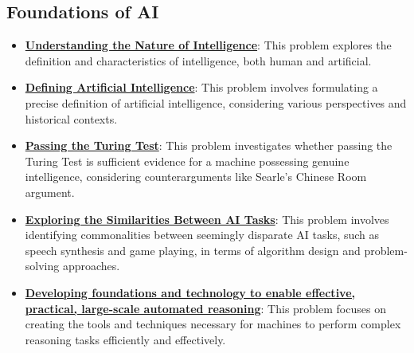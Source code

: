\documentclass{article}%
\begin{document}
\subsection{Foundations of AI}%
\label{subsec:FoundationsofAI}%
\begin{itemize}[leftmargin=*]%
\item \href{https://purdue.brightspace.com/d2l/common/assets/pdfjs-d2l-dist/1.0.14-legacy/web/viewer.html?file=\%2Fcontent\%2Fenforced\%2F1095467-wl.202510.CS.24300.001\%2F02L2-Intro.pdf\%3Fou\%3D1095467\&lang=en-us\&container=d2l-fileviewer-rendered-pdf\&fullscreen=d2l-fileviewer-rendered-pdf-dialog\&height=667#page=3}{\textbf{Understanding the Nature of Intelligence}}: This problem explores the definition and characteristics of intelligence, both human and artificial.%
\item \href{https://purdue.brightspace.com/d2l/common/assets/pdfjs-d2l-dist/1.0.14-legacy/web/viewer.html?file=\%2Fcontent\%2Fenforced\%2F1095467-wl.202510.CS.24300.001\%2F02L2-Intro.pdf\%3Fou\%3D1095467\&lang=en-us\&container=d2l-fileviewer-rendered-pdf\&fullscreen=d2l-fileviewer-rendered-pdf-dialog\&height=667#page=5}{\textbf{Defining Artificial Intelligence}}: This problem involves formulating a precise definition of artificial intelligence, considering various perspectives and historical contexts.%
\item \href{https://purdue.brightspace.com/d2l/common/assets/pdfjs-d2l-dist/1.0.14-legacy/web/viewer.html?file=\%2Fcontent\%2Fenforced\%2F1095467-wl.202510.CS.24300.001\%2F02L2-Intro.pdf\%3Fou\%3D1095467\&lang=en-us\&container=d2l-fileviewer-rendered-pdf\&fullscreen=d2l-fileviewer-rendered-pdf-dialog\&height=667#page=6}{\textbf{Passing the Turing Test}}: This problem investigates whether passing the Turing Test is sufficient evidence for a machine possessing genuine intelligence, considering counterarguments like Searle's Chinese Room argument.%
\item \href{https://purdue.brightspace.com/d2l/common/assets/pdfjs-d2l-dist/1.0.14-legacy/web/viewer.html?file=\%2Fcontent\%2Fenforced\%2F1095467-wl.202510.CS.24300.001\%2F02L2-Intro.pdf\%3Fou\%3D1095467\&lang=en-us\&container=d2l-fileviewer-rendered-pdf\&fullscreen=d2l-fileviewer-rendered-pdf-dialog\&height=667#page=31}{\textbf{Exploring the Similarities Between AI Tasks}}: This problem involves identifying commonalities between seemingly disparate AI tasks, such as speech synthesis and game playing, in terms of algorithm design and problem-solving approaches.%
\item \href{https://purdue.brightspace.com/d2l/common/assets/pdfjs-d2l-dist/1.0.14-legacy/web/viewer.html?file=\%2Fcontent\%2Fenforced\%2F1095467-wl.202510.CS.24300.001\%2F13L1-Logic.pdf\%3Fou\%3D1095467\&lang=en-us\&container=d2l-fileviewer-rendered-pdf\&fullscreen=d2l-fileviewer-rendered-pdf-dialog\&height=667#page=4}{\textbf{Developing foundations and technology to enable effective, practical, large-scale automated reasoning}}: This problem focuses on creating the tools and techniques necessary for machines to perform complex reasoning tasks efficiently and effectively.%

\end{itemize}
\end{document}
